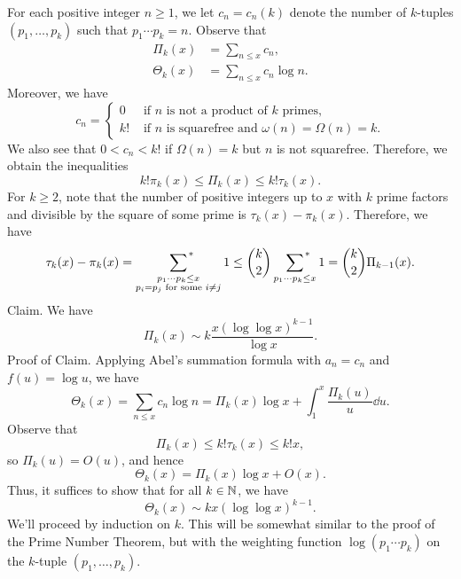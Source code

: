 \begin{pf}
    For each positive integer $n \geq 1$, we let $c_n = c_n(k)$ denote the number 
    of $k$-tuples $(p_1, \dots, p_k)$ such that $p_1 \cdots p_k = n$. 
    Observe that 
    \begin{align*}
        \Pi_k(x) &= \sum_{n\leq x} c_n, \\ 
        \Theta_k(x) &= \sum_{n\leq x} c_n \log n.
    \end{align*}
    Moreover, we have 
    \[ c_n = \begin{cases} 
        0 & \text{ if $n$ is not a product of $k$ primes,} \\
        k! & \text{ if $n$ is squarefree and $\omega(n) = \Omega(n) = k$.} 
    \end{cases} \] 
    We also see that $0 < c_n < k!$ if $\Omega(n) = k$ but $n$ is not squarefree. 
    Therefore, we obtain the inequalities 
    \[ k!\pi_k(x) \leq \Pi_k(x) \leq k!\tau_k(x). \tag{4.1}\label{eq:4.1} \] 
    For $k \geq 2$, note that the number of positive integers up to $x$ with 
    $k$ prime factors and divisible by the square of some prime is 
    $\tau_k(x) - \pi_k(x)$. Therefore, we have 
    \[ \tau_k(x) - \pi_k(x) = 
    \sum_{\substack{p_1\cdots p_k \leq x \\ p_i = p_j \text{ for some } i \neq j}}
    {\vphantom{\sum}}^{\hspace{-6.5ex}*} \hspace{5.5ex} 1 
    \leq \binom{k}{2} \sum_{p_1\cdots p_k \leq x}
    {\vphantom{\sum}}^{\hspace{-2.5ex}*} \hspace{1.5ex} 1 
    = \binom{k}{2} \Pi_{k-1}(x). \]
    {\sc Claim.} We have 
    \[ \Pi_k(x) \sim k \frac{x(\log \log x)^{k-1}}{\log x}. \] 
    {\sc Proof of Claim.} Applying Abel's summation formula with $a_n = c_n$ 
    and $f(u) = \log u$, we have 
    \[ \Theta_k(x) = \sum_{n \leq x} c_n \log n = \Pi_k(x) \log x 
    + \int_1^x \frac{\Pi_k(u)}{u}\dd u. \] 
    Observe that 
    \[ \Pi_k(x) \leq k!\tau_k(x) \leq k!x, \] 
    so $\Pi_k(u) = O(u)$, and hence 
    \[ \Theta_k(x) = \Pi_k(x) \log x + O(x). \] 
    Thus, it suffices to show that for all $k \in \mathbb{N}$, we have 
    \[ \Theta_k(x) \sim kx(\log \log x)^{k-1}. \tag{4.2}\label{eq:4.2} \] 
    We'll proceed by induction on $k$. This will be somewhat similar to the 
    proof of the Prime Number Theorem, but with the weighting function 
    $\log(p_1 \cdots p_k)$ on the $k$-tuple $(p_1, \dots, p_k)$. 


\end{pf}
